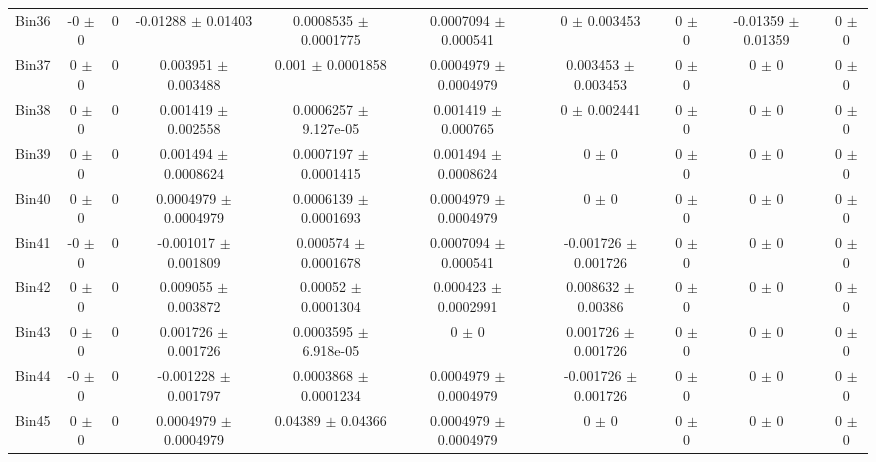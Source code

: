 \begin{tabular}{@{\extracolsep{4pt}}lccccccccc@{}}
     Bin36 & -0 $\pm$ 0 & 0 & -0.01288 $\pm$ 0.01403 & 0.0008535 $\pm$ 0.0001775 & 0.0007094 $\pm$ 0.000541 & 0 $\pm$ 0.003453 & 0 $\pm$ 0 & -0.01359 $\pm$ 0.01359 & 0 $\pm$ 0 \\ 
     Bin37 & 0 $\pm$ 0 & 0 & 0.003951 $\pm$ 0.003488 & 0.001 $\pm$ 0.0001858 & 0.0004979 $\pm$ 0.0004979 & 0.003453 $\pm$ 0.003453 & 0 $\pm$ 0 & 0 $\pm$ 0 & 0 $\pm$ 0 \\ 
     Bin38 & 0 $\pm$ 0 & 0 & 0.001419 $\pm$ 0.002558 & 0.0006257 $\pm$ 9.127e-05 & 0.001419 $\pm$ 0.000765 & 0 $\pm$ 0.002441 & 0 $\pm$ 0 & 0 $\pm$ 0 & 0 $\pm$ 0 \\ 
     Bin39 & 0 $\pm$ 0 & 0 & 0.001494 $\pm$ 0.0008624 & 0.0007197 $\pm$ 0.0001415 & 0.001494 $\pm$ 0.0008624 & 0 $\pm$ 0 & 0 $\pm$ 0 & 0 $\pm$ 0 & 0 $\pm$ 0 \\ 
     Bin40 & 0 $\pm$ 0 & 0 & 0.0004979 $\pm$ 0.0004979 & 0.0006139 $\pm$ 0.0001693 & 0.0004979 $\pm$ 0.0004979 & 0 $\pm$ 0 & 0 $\pm$ 0 & 0 $\pm$ 0 & 0 $\pm$ 0 \\ 
     Bin41 & -0 $\pm$ 0 & 0 & -0.001017 $\pm$ 0.001809 & 0.000574 $\pm$ 0.0001678 & 0.0007094 $\pm$ 0.000541 & -0.001726 $\pm$ 0.001726 & 0 $\pm$ 0 & 0 $\pm$ 0 & 0 $\pm$ 0 \\ 
     Bin42 & 0 $\pm$ 0 & 0 & 0.009055 $\pm$ 0.003872 & 0.00052 $\pm$ 0.0001304 & 0.000423 $\pm$ 0.0002991 & 0.008632 $\pm$ 0.00386 & 0 $\pm$ 0 & 0 $\pm$ 0 & 0 $\pm$ 0 \\ 
     Bin43 & 0 $\pm$ 0 & 0 & 0.001726 $\pm$ 0.001726 & 0.0003595 $\pm$ 6.918e-05 & 0 $\pm$ 0 & 0.001726 $\pm$ 0.001726 & 0 $\pm$ 0 & 0 $\pm$ 0 & 0 $\pm$ 0 \\ 
     Bin44 & -0 $\pm$ 0 & 0 & -0.001228 $\pm$ 0.001797 & 0.0003868 $\pm$ 0.0001234 & 0.0004979 $\pm$ 0.0004979 & -0.001726 $\pm$ 0.001726 & 0 $\pm$ 0 & 0 $\pm$ 0 & 0 $\pm$ 0 \\ 
     Bin45 & 0 $\pm$ 0 & 0 & 0.0004979 $\pm$ 0.0004979 & 0.04389 $\pm$ 0.04366 & 0.0004979 $\pm$ 0.0004979 & 0 $\pm$ 0 & 0 $\pm$ 0 & 0 $\pm$ 0 & 0 $\pm$ 0 \\ 
\hline\hline
  \end{tabular}
